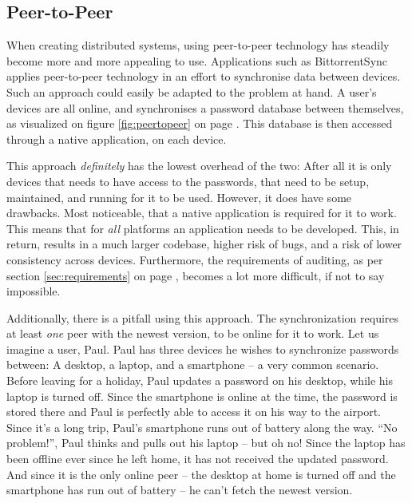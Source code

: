 		\subsection{Peer-to-Peer}



			When creating distributed systems, using peer-to-peer technology has steadily become more and more appealing to use. Applications such as BittorrentSync applies peer-to-peer technology in an effort to synchronise data between devices. Such an approach could easily be adapted to the problem at hand. A user's devices are all online, and synchronises a password database between themselves, as visualized on figure  \ref{fig:peertopeer} on page \pageref{fig:peertopeer}. This database is then accessed through a native application, on each device. 

			This approach \emph{definitely} has the lowest overhead of the two: After all it is only devices that needs to have access to the passwords, that need to be setup, maintained, and running for it to be used. However, it does have some drawbacks. Most noticeable, that a native application is required for it to work. This means that for \emph{all} platforms an application needs to be developed. This, in return, results in a much larger codebase, higher risk of bugs, and a risk of lower consistency across devices. Furthermore, the requirements of auditing, as per section \ref{sec:requirements} on page \pageref{sec:requirements}, becomes a lot more difficult, if not to say impossible.

			Additionally, there is a pitfall using this approach. The synchronization requires at least \emph{one} peer with the newest version, to be online for it to work. Let us imagine a user, Paul. Paul has three devices he wishes to synchronize passwords between: A desktop, a laptop, and a smartphone -- a very common scenario. Before leaving for a holiday, Paul updates a password on his desktop, while his laptop is turned off. Since the smartphone is online at the time, the password is stored there and Paul is perfectly able to access it on his way to the airport. Since it's a long trip, Paul's smartphone runs out of battery along the way. ``No problem!'', Paul thinks and pulls out his laptop -- but oh no! Since the laptop has been offline ever since he left home, it has not received the updated password. And since it is the only online peer -- the desktop at home is turned off and the smartphone has run out of battery -- he can't fetch the newest version. 

